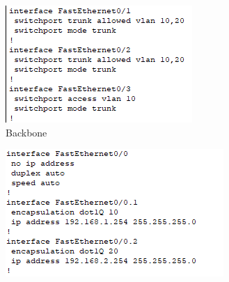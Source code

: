 \begin{figure}[!htb]
    \centering
    \begin{subfigure}{.45\textwidth}
        \includegraphics[width=\textwidth,height=\textwidth,keepaspectratio]{./img/test1/backbone.png}
        \caption{Backbone}
    \end{subfigure}
    \begin{subfigure}{.45\textwidth}
        \includegraphics[width=\textwidth,height=\textwidth,keepaspectratio]{./img/test1/router.png}

\end{subfigure}
\end{figure}
